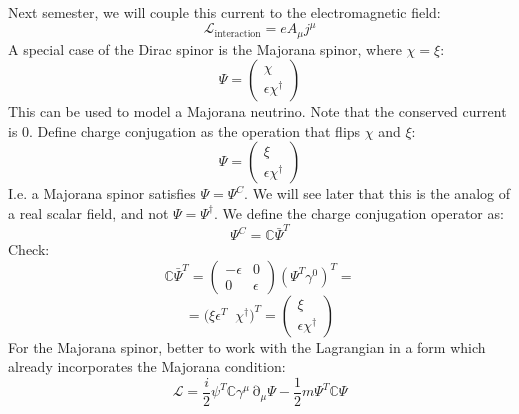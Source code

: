 \documentclass[12 pt]{article}
\DeclareMathOperator {\p} {\partial}
\begin{document}
Next semester, we will couple this current to the electromagnetic field:
\[    \mathcal{L}_{\text{interaction}} = e A_{\mu} j^{\mu}   \]
A special case of the Dirac spinor is the Majorana spinor, where $\chi = \xi$:
\[       \Psi = \left( \begin{array} {c} \chi \\ \epsilon \chi^{\dagger} \end{array} \right)       \]
This can be used to model a Majorana neutrino. Note that the conserved current is 0. Define charge conjugation as the operation that flips $\chi$ and $\xi$:
\[     \Psi = \left( \begin{array} {c} \xi \\ \epsilon \chi^{\dagger} \end{array} \right)       \]
I.e. a Majorana spinor satisfies $\Psi = \Psi^C$. We will see later that this is the analog of a real scalar field, and not $\Psi = \Psi^{\dagger}$. We define the charge conjugation operator as:
\[      \Psi^C = \mathbb{C} \bar \Psi^T     \]
Check:
\[   \mathbb{C} \bar \Psi^T = \left(   \begin{array} {cc} - \epsilon & 0 \\ 0 & \epsilon \end{array} \right) ( \Psi^T \gamma^0)^T =    \]
\[       = \big(   \xi \epsilon^T\;\; \chi^{\dagger} \big)^T = \left( \begin{array} {c} \xi \\ \epsilon \chi^{\dagger} \end{array} \right)        \]
For the Majorana spinor, better to work with the Lagrangian in a form which already incorporates the Majorana condition:
\[     \mathcal{L} = \frac{i}{2} \psi^T \mathbb{C} \gamma^{\mu} \p_{\mu} \Psi - \frac{1}{2} m \Psi^T \mathbb{C} \Psi     \]
\end{document}
